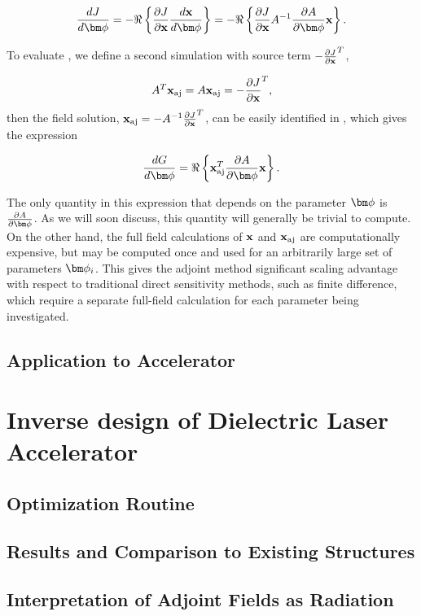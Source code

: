 \begin{equation}
\dfrac{J}{\bfphi} =  - \real{ \pfrac{J}{\bfx} \dfrac{\bfx}{\bfphi} } = - \real{ \pfrac{J}{\bfx} A^{-1} \pfrac{A}{\bfphi} \bfx }
\label{eq:dGdgamma_2}.
\end{equation}

To evaluate , we define a second simulation with source term $-\frac{\partial J}{\partial \mathbf{x}}^T$,

\begin{equation}
A^T\mathbf{x}_{\textrm{aj}} = A\mathbf{x}_{\textrm{aj}} = -\frac{\partial J}{\partial \mathbf{x}}^T,
\label{eq:adjoint_source}
\end{equation}
then the field solution, $\mathbf{x}_{\textrm{aj}} = -A^{-1}\frac{\partial J}{\partial \mathbf{x}}^T$, can be easily identified in , which gives the expression

\begin{equation}
\dfrac{G}{\bfphi} = \real{ \bfx_\aj^T \pfrac{A}{\bfphi} \bfx }.
\label{eq:final_form_DGdgamma}
\end{equation}

The only quantity in this expression that depends on the parameter $\bfphi$ is $\pfrac{A}{\bfphi}$.  As we will soon discuss, this quantity will generally be trivial to compute.
On the other hand, the full field calculations of $\mathbf{x}$ and $\mathbf{x}_{\textrm{aj}}$ are computationally expensive, but may be computed once and used for an arbitrarily large set of parameters $\bfphi_i$.
This gives the adjoint method significant scaling advantage with respect to traditional direct sensitivity methods, such as finite difference, which require a separate full-field calculation for each parameter being investigated.

\subsection{Application to Accelerator}



\section{Inverse design of Dielectric Laser Accelerator}{}

\subsection{Optimization Routine}

\subsection{Results and Comparison to Existing Structures}

\subsection{Interpretation of Adjoint Fields as Radiation}
